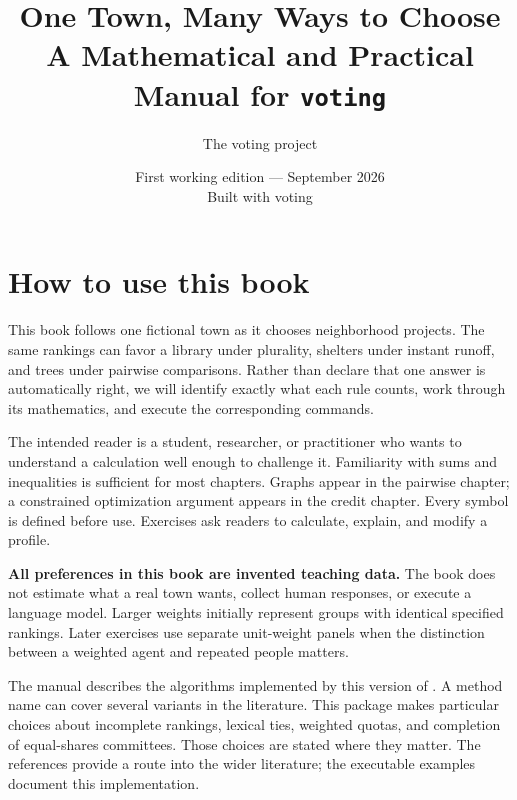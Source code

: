 \documentclass[11pt,oneside]{book}
\title{One Town, Many Ways to Choose\\[.5em]\large A Mathematical and Practical Manual for \texttt{voting}}
\author{The voting project}
\date{First working edition --- September 2026\\Built with voting \VotingVersion}
\newcommand{\code}[1]{\texttt{\detokenize{#1}}}
\begin{document}
\frontmatter
\maketitle
\chapter*{How to use this book}
This book follows one fictional town as it chooses neighborhood projects. The same rankings can favor a library under plurality, shelters under instant runoff, and trees under pairwise comparisons. Rather than declare that one answer is automatically right, we will identify exactly what each rule counts, work through its mathematics, and execute the corresponding commands.

The intended reader is a student, researcher, or practitioner who wants to understand a calculation well enough to challenge it. Familiarity with sums and inequalities is sufficient for most chapters. Graphs appear in the pairwise chapter; a constrained optimization argument appears in the credit chapter. Every symbol is defined before use. Exercises ask readers to calculate, explain, and modify a profile.

\textbf{All preferences in this book are invented teaching data.} The book does not estimate what a real town wants, collect human responses, or execute a language model. Larger weights initially represent groups with identical specified rankings. Later exercises use separate unit-weight panels when the distinction between a weighted agent and repeated people matters.

The manual describes the algorithms implemented by this version of \code{voting}. A method name can cover several variants in the literature. This package makes particular choices about incomplete rankings, lexical ties, weighted quotas, and completion of equal-shares committees. Those choices are stated where they matter. The references provide a route into the wider literature; the executable examples document this implementation.
\end{document}
